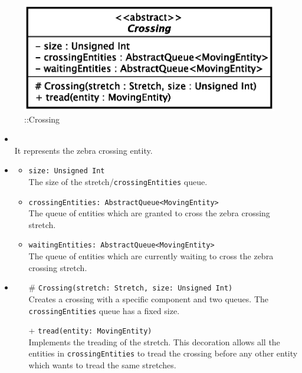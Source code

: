 \begin{figure}[h]
\centering
\includegraphics[scale=0.6,keepaspectratio]{images/solution/app/backend/crossing.eps}
\caption{\pReactiveComponentStretchDecoration::Crossing}
\label{fig:sd-app-crossing}
\end{figure}
\FloatBarrier
\begin{itemize}
  \item \textbf{\descr} \\
    It represents the zebra crossing entity. 
  \item \textbf{\attrs}
  \begin{itemize}
    \item \texttt{size: Unsigned Int} \\
The size of the stretch/\texttt{crossingEntities} queue.
    \item \texttt{crossingEntities: AbstractQueue<MovingEntity>} \\
The queue of entities which are granted to cross the zebra crossing stretch.
  \item \texttt{waitingEntities: AbstractQueue<MovingEntity>} \\
The queue of entities which are currently waiting to cross the zebra crossing stretch.
  \end{itemize}
\item \textbf{\ops}
  \begin{itemize}
    \item[\#] \texttt{Crossing(stretch: Stretch, size: Unsigned Int)} \\
Creates a crossing with a specific component and two queues. The
\texttt{crossingEntities} queue has a fixed size.
    \item[+] \texttt{tread(entity: MovingEntity)} \\
Implements the treading of the stretch. This decoration allows all the
entities in \texttt{crossingEntities} to tread the crossing before any other entity
which wants to tread the same stretches.
  \end{itemize}
\end{itemize}
